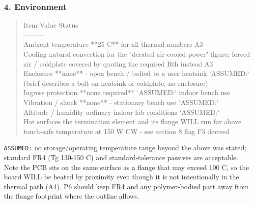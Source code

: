 \documentclass[11pt,a4paper]{article}
\begin{document}
\subsubsection*{4. Environment}
\begin{quote}\small\ttfamily\raggedright
\textbar{} Item \textbar{} Value \textbar{} Status \textbar{}\\
\textbar{}---\textbar{}---\textbar{}---\textbar{}\\
\textbar{} Ambient temperature \textbar{} {*}{*}25 C{*}{*} for all thermal numbers \textbar{} A3 \textbar{}\\
\textbar{} Cooling \textbar{} natural convection for the "derated air-cooled power" figure; forced air / coldplate covered by quoting the required Rth instead \textbar{} A3 \textbar{}\\
\textbar{} Enclosure \textbar{} {*}{*}none{*}{*} - open bench / bolted to a user heatsink \textbar{} `ASSUMED:` (brief describes a bolt-on heatsink or coldplate, no enclosure) \textbar{}\\
\textbar{} Ingress protection \textbar{} {*}{*}none required{*}{*} \textbar{} `ASSUMED:` indoor bench use \textbar{}\\
\textbar{} Vibration / shock \textbar{} {*}{*}none{*}{*} - stationary bench use \textbar{} `ASSUMED:` \textbar{}\\
\textbar{} Altitude / humidity \textbar{} ordinary indoor lab conditions \textbar{} `ASSUMED:` \textbar{}\\
\textbar{} Hot surfaces \textbar{} the termination element and its flange WILL run far above touch-safe temperature at 150 W CW - see section 8 flag F3 \textbar{} derived \textbar{}
\end{quote}
\texttt{ASSUMED:} no storage/operating temperature range beyond the above was stated; standard FR4 (Tg 130-150 C) and standard-tolerance passives are acceptable. Note the PCB sits on the same surface as a flange that may exceed 100 C, so the board WILL be heated by proximity even though it is not intentionally in the thermal path (A4). P6 should keep FR4 and any polymer-bodied part away from the flange footprint where the outline allows.
\end{document}
